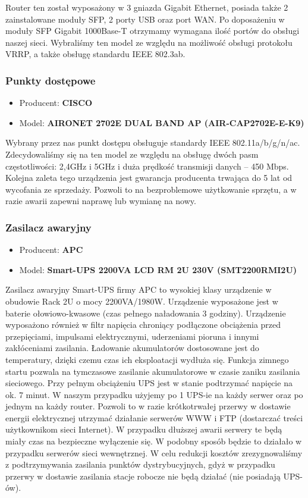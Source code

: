 \documentclass[12pt,a4paper,titlepage]{article}
\begin{document}
Router ten został wyposażony w 3 gniazda Gigabit Ethernet, posiada także 2 zainstalowane moduły SFP, 2 porty USB oraz port WAN. Po doposażeniu w moduły SFP Gigabit 1000Base-T otrzymamy wymagana ilość portów do obsługi naszej sieci. Wybraliśmy ten model ze względu na możliwość obsługi protokołu VRRP, a także obsługę standardu IEEE 802.3ab.

\subsubsection{Punkty dostępowe}
\begin{itemize}
    \item Producent: \textbf{CISCO}
    \item Model: \textbf{AIRONET 2702E DUAL BAND AP (AIR-CAP2702E-E-K9)}
\end{itemize}

Wybrany przez nas punkt dostępu obsługuje standardy IEEE 802.11a/b/g/n/ac. Zdecydowaliśmy się na ten model ze względu na obsługę dwóch pasm częstotliwości: 2,4GHz i 5GHz i duża prędkość
transmisji danych – 450 Mbps. Kolejna zaleta tego urządzenia jest gwarancja producenta trwająca do 5 lat od wycofania ze sprzedaży. Pozwoli to na bezproblemowe użytkowanie sprzętu, a w razie awarii zapewni naprawę lub wymianę na nowy.

\subsubsection{Zasilacz awaryjny}
\begin{itemize}
    \item Producent: \textbf{APC}
    \item Model: \textbf{Smart-UPS 2200VA LCD RM 2U 230V (SMT2200RMI2U)}
\end{itemize}
Zasilacz awaryjny Smart-UPS firmy APC to wysokiej klasy urządzenie w obudowie Rack 2U o mocy 2200VA/1980W. Urządzenie wyposażone jest w baterie ołowiowo-kwasowe (czas pełnego naładowania 3 godziny). Urządzenie wyposażono również w filtr napięcia chroniący podłączone obciążenia przed przepięciami, impulsami elektrycznymi, uderzeniami pioruna i innymi zakłóceniami zasilania. Ładowanie akumulatorów dostosowane jest do temperatury, dzięki czemu czas ich eksploatacji wydłuża się. Funkcja zimnego startu pozwala na tymczasowe zasilanie akumulatorowe w czasie zaniku zasilania sieciowego. Przy pełnym obciążeniu UPS jest w stanie podtrzymać napięcie na ok. 7 minut. W naszym przypadku użyjemy po 1 UPS-ie na każdy serwer oraz po jednym na każdy router. Pozwoli to w razie krótkotrwałej przerwy w dostawie energii elektrycznej utrzymać działanie serwerów WWW i FTP (dostarczać treści użytkownikom sieci Internet). W przypadku dłuższej awarii serwery te będą miały czas na bezpieczne wyłączenie się. W podobny sposób będzie to działało w przypadku serwerów sieci wewnętrznej. W celu redukcji kosztów zrezygnowaliśmy z podtrzymywania zasilania punktów dystrybucyjnych, gdyż w przypadku przerwy w dostawie zasilania stacje robocze nie będą działać (nie posiadają UPS-ów).
\end{document}
